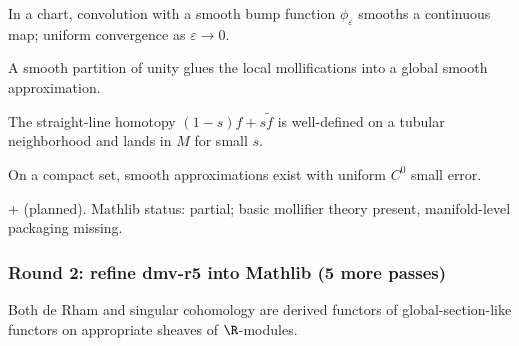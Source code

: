 \begin{lemma}
\label{lem:dsq-r6}
In a chart, convolution with a smooth bump function $\phi_{\varepsilon}$ smooths a continuous map; uniform convergence as $\varepsilon\to 0$.
\leanok
\end{lemma}

\begin{lemma}
\label{lem:dsq-r7}
A smooth partition of unity glues the local mollifications into a global smooth approximation.
\leanok
\end{lemma}

\begin{lemma}
\label{lem:dsq-r8}
The straight-line homotopy $(1-s)f + s\tilde f$ is well-defined on a tubular neighborhood and lands in $M$ for small $s$.
\leanok
\end{lemma}

\begin{lemma}
\label{lem:dsq-r9}
On a compact set, smooth approximations exist with uniform $C^{0}$ small error.
\leanok
\end{lemma}

\begin{lemma}
\label{lem:dsq-r10}
 +  (planned).  Mathlib status: partial; basic mollifier theory present, manifold-level packaging missing.
\leanok
\end{lemma}

\subsubsection*{Round 2: refine dmv-r5 into Mathlib (5 more passes)}

\begin{lemma}
\label{lem:dmv-r6}
Both de Rham and singular cohomology are derived functors of global-section-like functors on appropriate sheaves of $\R$-modules.
\leanok
\end{lemma}

